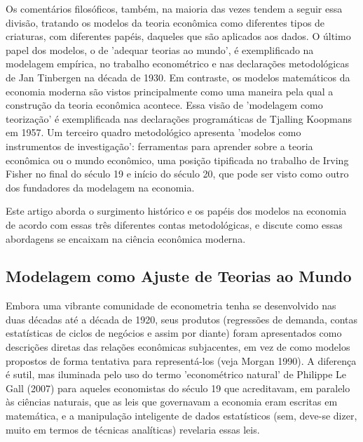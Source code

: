 \documentclass[a4paper,12pt]{article}[abntex2]
\begin{document}
Os comentários filosóficos, também, na maioria das vezes tendem a seguir essa divisão, tratando os modelos da teoria econômica como diferentes tipos de criaturas, com diferentes papéis, daqueles que são aplicados aos dados. O último papel dos modelos, o de 'adequar teorias ao mundo', é exemplificado na modelagem empírica, no trabalho econométrico e nas declarações metodológicas de Jan Tinbergen na década de 1930. Em contraste, os modelos matemáticos da economia moderna são vistos principalmente como uma maneira pela qual a construção da teoria econômica acontece. Essa visão de 'modelagem como teorização' é exemplificada nas declarações programáticas de Tjalling Koopmans em 1957. Um terceiro quadro metodológico apresenta 'modelos como instrumentos de investigação': ferramentas para aprender sobre a teoria econômica ou o mundo econômico, uma posição tipificada no trabalho de Irving Fisher no final do século 19 e início do século 20, que pode ser visto como outro dos fundadores da modelagem na economia.

Este artigo aborda o surgimento histórico e os papéis dos modelos na economia de acordo com essas três diferentes contas metodológicas, e discute como essas abordagens se encaixam na ciência econômica moderna.

\subsection{\textbf{Modelagem como Ajuste de Teorias ao Mundo}}
Embora uma vibrante comunidade de econometria tenha se desenvolvido nas duas décadas até a década de 1920, seus produtos (regressões de demanda, contas estatísticas de ciclos de negócios e assim por diante) foram apresentados como descrições diretas das relações econômicas subjacentes, em vez de como modelos propostos de forma tentativa para representá-los (veja Morgan 1990). A diferença é sutil, mas iluminada pelo uso do termo 'econométrico natural' de Philippe Le Gall (2007) para aqueles economistas do século 19 que acreditavam, em paralelo às ciências naturais, que as leis que governavam a economia eram escritas em matemática, e a manipulação inteligente de dados estatísticos (sem, deve-se dizer, muito em termos de técnicas analíticas) revelaria essas leis.
\end{document}

